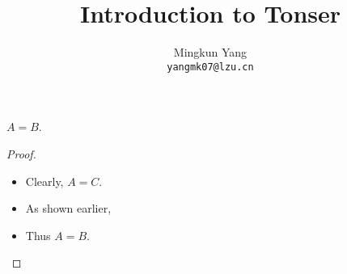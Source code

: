 \documentclass{beamer}
\title{Introduction to Tonser}
\author{Mingkun Yang
\\ \texttt{yangmk07@lzu.cn}}
\institute{
School of Physics\\
Lanzhou University\\
}
\date{}
\begin{document}
\begin{frame}[<+->]
	\begin{theorem}
		$A = B$.
	\end{theorem}
	\begin{proof}
		\begin{itemize}
			\item Clearly, $A = C$.
			\item As shown earlier,
			\item<2-> Thus $A = B$.
		\end{itemize}
	\end{proof}
\end{frame}
\end{document}
